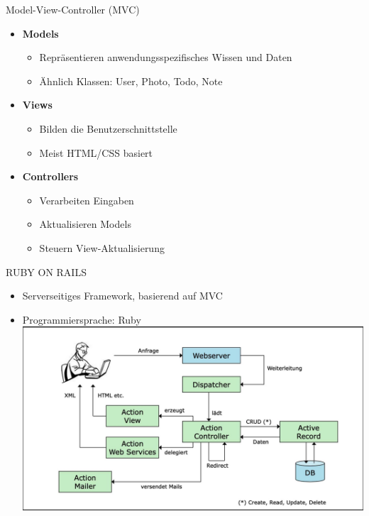 \begin{concept}{Model-View-Controller (MVC)}
    \begin{itemize}
        \item \textbf{Models}
            \begin{itemize}
                \item Repräsentieren anwendungsspezifisches Wissen und Daten
                \item Ähnlich Klassen: User, Photo, Todo, Note
            \end{itemize}
        \item \textbf{Views}
            \begin{itemize}
                \item Bilden die Benutzerschnittstelle
                \item Meist HTML/CSS basiert
            \end{itemize}
        \item \textbf{Controllers}
            \begin{itemize}
                \item Verarbeiten Eingaben
                \item Aktualisieren Models
                \item Steuern View-Aktualisierung
            \end{itemize}
    \end{itemize}
\end{concept}

\begin{definition}{RUBY ON RAILS}
\begin{itemize}
  \item Serverseitiges Framework, basierend auf MVC
  \item Programmiersprache: Ruby\\
\includegraphics[width=\linewidth]{images/2025_01_02_22162ee5453ad0230328g-09}
\end{itemize}
\end{definition}

